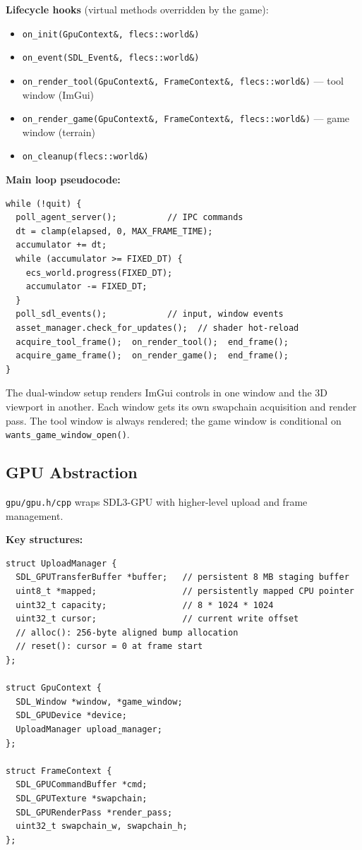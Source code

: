 \documentclass[11pt,a4paper]{article}
\begin{document}
\textbf{Lifecycle hooks} (virtual methods overridden by the game):
\begin{itemize}
  \item \texttt{on\_init(GpuContext\&, flecs::world\&)}
  \item \texttt{on\_event(SDL\_Event\&, flecs::world\&)}
  \item \texttt{on\_render\_tool(GpuContext\&, FrameContext\&, flecs::world\&)} --- tool window (ImGui)
  \item \texttt{on\_render\_game(GpuContext\&, FrameContext\&, flecs::world\&)} --- game window (terrain)
  \item \texttt{on\_cleanup(flecs::world\&)}
\end{itemize}

\textbf{Main loop pseudocode:}
\begin{lstlisting}[numbers=none]
while (!quit) {
  poll_agent_server();          // IPC commands
  dt = clamp(elapsed, 0, MAX_FRAME_TIME);
  accumulator += dt;
  while (accumulator >= FIXED_DT) {
    ecs_world.progress(FIXED_DT);
    accumulator -= FIXED_DT;
  }
  poll_sdl_events();            // input, window events
  asset_manager.check_for_updates();  // shader hot-reload
  acquire_tool_frame();  on_render_tool();  end_frame();
  acquire_game_frame();  on_render_game();  end_frame();
}
\end{lstlisting}

\begin{howtip}
The dual-window setup renders ImGui controls in one window and the 3D viewport in another. Each window gets its own swapchain acquisition and render pass. The tool window is always rendered; the game window is conditional on \texttt{wants\_game\_window\_open()}.
\end{howtip}

\subsection{GPU Abstraction}
\label{sec:gpu}

\texttt{gpu/gpu.h/cpp} wraps SDL3-GPU with higher-level upload and frame management.

\textbf{Key structures:}
\begin{lstlisting}
struct UploadManager {
  SDL_GPUTransferBuffer *buffer;   // persistent 8 MB staging buffer
  uint8_t *mapped;                 // persistently mapped CPU pointer
  uint32_t capacity;               // 8 * 1024 * 1024
  uint32_t cursor;                 // current write offset
  // alloc(): 256-byte aligned bump allocation
  // reset(): cursor = 0 at frame start
};

struct GpuContext {
  SDL_Window *window, *game_window;
  SDL_GPUDevice *device;
  UploadManager upload_manager;
};

struct FrameContext {
  SDL_GPUCommandBuffer *cmd;
  SDL_GPUTexture *swapchain;
  SDL_GPURenderPass *render_pass;
  uint32_t swapchain_w, swapchain_h;
};
\end{lstlisting}
\end{document}

